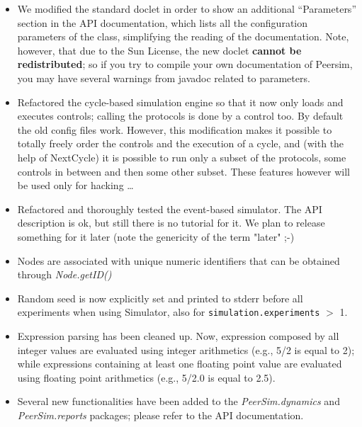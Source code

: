 \documentclass[a4paper,11pt]{article}
\begin{document}
\begin{itemize}

\item We modified the standard doclet in order to show an additional 
  ``Parameters'' section in the API documentation, which lists all the
  configuration parameters of the class, simplifying the reading of
  the documentation. Note, however, that due to the Sun License, 
  the new doclet \textbf{cannot be redistributed}; so if you try to compile
  your own documentation of Peersim, you may have several warnings
  from javadoc related to parameters.

\item Refactored the cycle-based simulation engine so that it now only
  loads and  
  executes controls; calling the protocols is done by a control too. By default
  the old config files work. However, this modification makes it possible
  to totally freely order the controls and the execution of a cycle, and
  (with the help of NextCycle) it is possible to run only a subset of the
  protocols, some controls in between and then some other subset. These
  features however will be used only for hacking \dots

\item Refactored and thoroughly tested the event-based simulator. The API
  description is ok, but still there is no tutorial for it. We plan
  to release something for it later (note the genericity of the
  term "later" ;-)

\item Nodes are associated with unique numeric identifiers that can be obtained
  through \emph{Node.getID()}

\item Random seed is now explicitly set and printed to stderr before all
  experiments when using Simulator, also for
  \texttt{simulation.experiments} $>$ 1.

\item Expression parsing has been cleaned up. Now, expression composed by
  all integer values are evaluated using integer arithmetics (e.g.,
  5/2 is equal to 2); while expressions containing at least one floating
  point value are evaluated using floating point arithmetics (e.g.,
  5/2.0 is equal to 2.5).

\item Several new functionalities have been added to the
  \emph{PeerSim.dynamics} 
  and \emph{PeerSim.reports} packages; please refer to the API documentation.

\end{itemize}
\end{document}
